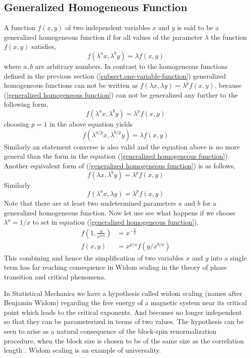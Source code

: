 	
	
	\subsection{Generalized Homogeneous Function}
	A function $f(x,y)$ of two independent variables $x$ and $y$ is said to be a generalized homogeneous function if for all values of the parameter $\lambda$ the function $f(x,y)$ satisfies,
	\begin{equation}
		f(\lambda^a x, \lambda^b y) = \lambda f(x,y)
		\label{generalized homogeneous function}
	\end{equation}
	where $a,b$ are arbitrary numbers. In contrast to the homogeneous functions defined in the previous section (\ref{subsect.one-variable-function}) generalized homogeneous functions can not be written as $f(\lambda x, \lambda y) = \lambda^p f(x,y)$, because (\ref{generalized homogeneous function}) can not be generalized any further to the following form,
	\begin{equation}
		f(\lambda^a x, \lambda^b y) = \lambda^p f(x,y)
	\end{equation}
	choosing $p=1$ in the above equation yields
	\begin{equation}
		f(\lambda^{a/p} x, \lambda^{b/p} y) = \lambda f(x,y)
	\end{equation}
	Similarly an statement converse is also valid and the equation above is no more general than the form in the equation (\ref{generalized homogeneous function}). Another equivalent form of (\ref{generalized homogeneous function})  is as follows,
	\begin{equation}
		f(\lambda x, \lambda^b y) = \lambda^p f(x,y)
	\end{equation}
	Similarly
	\begin{equation}
		f(\lambda^a x, \lambda y) = \lambda^p f(x,y)
	\end{equation}
	Note that there are at least two undetermined parameters $a$ and $b$ for a generalized homogeneous function. Now let use see what happens if we choose $\lambda^a = 1/x$ to set in equation (\ref{generalized homogeneous function}),
	\begin{align}
		f(1, \frac{y}{x^{b/a}}) &= x^{-\frac{p}{a}} \\
		f(x,y) &= x^{p/a} f(y/x^{b/a})
	\end{align}
	This combining and hence the simplification of two variables $x$ and $y$ into a single term has far reaching consequence in Widom scaling \cite{Kleinert2001, Huang1987, Sabbir}in the theory of phase transition and critical phenomena. 
	
	
	In Statistical Mechanics we have a hypothesis called widom scaling (names after Benjamin Widom)  regarding the free energy of a magnetic system near its critical point which leads to the critical exponents. And becomes no longer independent so that they can be parameterized in terms of two values. The hypothesis can be seen to arise as a natural consequence of the block-spin renormalization procedure, when the block size is chosen to be of the same size as the correlation length \cite{Stanley1987, Kleinert2001, Huang1987}.	Widom scaling is an example of universality.

